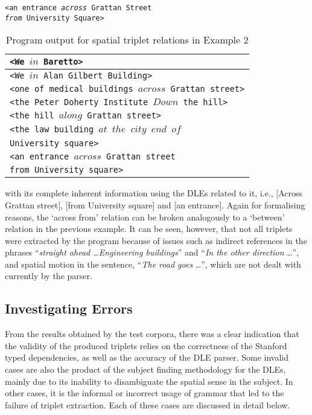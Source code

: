 \documentclass{acm_proc_article-sp}
\begin{document}
\texttt{<an entrance \textit{across} Grattan Street}\\ \texttt{\textit{from} University Square>}
\begin{table}
\begin{tabular}{|l|}
\hline
\texttt{<We $in$ Baretto>}\\ \hline
\texttt{<We $in$  Alan Gilbert Building>}\\ \hline
\texttt{<one of medical buildings $across$ Grattan street>}\\ \hline
\texttt{<the Peter Doherty Institute $Down$ the hill>}\\ \hline
\texttt{<the hill $along$ Grattan street>}\\ \hline
\texttt{<the law building $at$  $the$ $city$ $end$ $of$ }\\
\texttt{University square>}\\ \hline
\texttt{<an entrance $across$  Grattan street} \\
\texttt{from University square>}\\ \hline
\end{tabular}
\caption{Program output for spatial triplet relations in Example 2}
\label{table:ex2}
\end{table}
with its complete inherent information using the DLEs related to it, i.e., $[$Across Grattan street$]$, $[$from University square$]$ and $[$an entrance$]$. Again for formalising reasons, the `across from' relation can be broken analogously to a `between' relation in the previous example. It can be seen, however, that not all triplets were extracted by the program because of issues such as indirect references in the phrases ``\textit{straight ahead \dots Engineering buildings}'' and ``\textit{In the other direction} \dots'', and spatial motion in the sentence, ``\textit{The road goes} \dots'', which are not dealt with currently by the parser.
\subsection{Investigating Errors}
From the results obtained by the test corpora, there was a clear indication that the validity of the produced triplets relies on the correctness of the Stanford typed dependencies, as well as the accuracy of the DLE parser. Some invalid cases are also the product of the subject finding methodology for the DLEs, mainly due to its inability to disambiguate the spatial sense in the subject. In other cases, it is the informal or incorrect usage of grammar that led to the failure of triplet extraction. Each of these cases are discussed in detail below.
\end{document}
